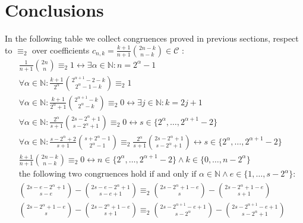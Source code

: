 
\section{Conclusions}
\label{sec:conclusions}

In the following table we collect congruences proved in previous sections, 
respect to $\equiv_{2}$ over coefficients $c_{n,k}=\frac{k+1}{n+1}{{2n-k}\choose{n-k}}\in\mathcal{C}$ :
\begin{displaymath}
    \begin{split}
        & \frac{1}{n+1}{{2n}\choose{n}} \equiv_{2} 1 \leftrightarrow \exists \alpha\in\mathbb{N}: n=2^{\alpha}-1  \\
        & \forall\alpha\in\mathbb{N}:\frac{k+1}{2^{\alpha}}{{2^{\alpha+1}-2-k}\choose{2^{\alpha}-1-k}} \equiv_{2} 1  \\
        & \forall\alpha\in\mathbb{N}:\frac{k+1}{2^{\alpha}+1}{{2^{\alpha+1}-k}\choose{2^{\alpha}-k}} \equiv_{2} 0 \leftrightarrow \exists j\in\mathbb{N}: k=2j+1   \\
        & \forall\alpha\in\mathbb{N}:\frac{2^{\alpha}}{s+1}{{2s-2^{\alpha}+1}\choose{s-2^{\alpha}+1}} \equiv_{2} 0 \leftrightarrow 
            s\in\lbrace 2^{\alpha}, \ldots, 2^{\alpha+1}-2\rbrace  \\
        & \forall\alpha\in\mathbb{N}:\frac{s-2^{\alpha}+2}{s+1}{{s+2^{\alpha}-1}\choose{2^{\alpha}-1}} \equiv_{2}
            \frac{2^{\alpha}}{s+1}{{2s-2^{\alpha}+1}\choose{s-2^{\alpha}+1}} \leftrightarrow 
                s\in\lbrace 2^{\alpha}, \ldots, 2^{\alpha+1}-2\rbrace  \\
        & \frac{k+1}{n+1}{{2n-k}\choose{n-k}} \equiv_{2} 0 \leftrightarrow 
            n \in\lbrace 2^{\alpha}, \ldots, 2^{\alpha+1} - 2\rbrace \wedge k \in \lbrace 0, \ldots, n - 2^{\alpha}\rbrace \\
        & \text{the following two congruences hold if and only if } \alpha\in\mathbb{N} \wedge e\in\lbrace1,\ldots,s-2^{{\alpha}}\rbrace:\\
        & {{2s-e-2^{{\alpha}}+1}\choose{s-e}} - {{2s-e-2^{{\alpha}}+1}\choose{s-e+1}} \equiv_{2}
            {{2s-2^{{\alpha}}+1-e}\choose{s}} - {{2s-2^{{\alpha}}+1-e}\choose{s+1}}\\
        & {{2s-2^{{\alpha}}+1-e}\choose{s}} - {{2s-2^{{\alpha}}+1-e}\choose{s+1}} \equiv_{2}
            {{2s-2^{{\alpha}+1}-e+1}\choose{s-2^{{\alpha}}}} - {{2s-2^{{\alpha}+1}-e+1}\choose{s-2^{{\alpha}}+1}}\\
    \end{split}
\end{displaymath}

